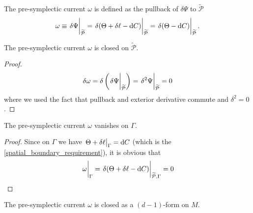 \documentclass[10pt]{article}
\begin{document}
\begin{definition}\label{def:Pre-symplectic-current}
    The pre-symplectic current $\omega$ is defined as the pullback of $\delta\Psi$ to $\widetilde{\mathcal{P}}$
    \begin{equation}
        \omega\equiv\eval{\delta\Psi}_{\widetilde{\mathcal{P}}}=\eval{\delta(\Theta+\delta\ell-\dd{C})}_{\widetilde{\mathcal{P}}}=\eval{\delta(\Theta-\dd{C})}_{\widetilde{\mathcal{P}}}.\label{eq:def_sym_curr}
    \end{equation}
\end{definition}
\begin{claim}
    The pre-symplectic current $\omega$ is closed on $\widetilde{\mathcal{P}}$.
\end{claim}
\begin{proof}
\begin{equation}
    \delta\omega=\delta\left(\eval{\delta\Psi}_{\widetilde{\mathcal{P}}}\right)=\eval{\delta^2\Psi}_{\widetilde{\mathcal{P}}}=0
\end{equation}
where we used the fact that pullback and exterior derivative commute and $\delta^2=0$.
\end{proof}
\begin{claim}
    The pre-symplectic current $\omega$ vanishes on $\Gamma$.
\end{claim}
\begin{proof}
    Since on $\Gamma$ we have $\eval{\Theta+\delta\ell}_\Gamma=\dd{C}$ (which is the \cref{spatial_boundary_requirement}), it is obvious that
    \begin{equation}
        \eval{\omega}_\Gamma=\eval{\delta(\Theta+\delta\ell-\dd{C})}_{\widetilde{\mathcal{P}},\Gamma}=0
    \end{equation}
\end{proof}
\begin{claim}
    The pre-symplectic current $\omega$ is closed as a $(d-1)$-form on $M$.
\end{claim}
\end{document}
